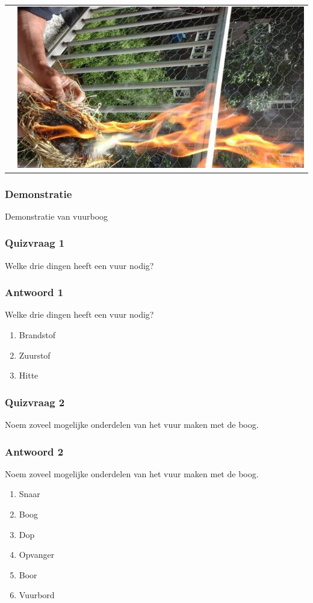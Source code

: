 \documentclass[a4paper, handout]{beamer}
\begin{document}
\begin{frame}
\begin{tabular}{ c c }
		&
		\includegraphics[scale=0.2]{blazen-4}
		\\
	\end{tabular}
\end{frame}

\begin{frame}
	\frametitle{Demonstratie}
	Demonstratie van vuurboog
\end{frame}

\begin{frame}
	\frametitle{Quizvraag 1}
	Welke drie dingen heeft een vuur nodig?
\end{frame}

\begin{frame}
	\frametitle{Antwoord 1}
	Welke drie dingen heeft een vuur nodig?
	\begin{enumerate}
		\item{Brandstof}
		\item{Zuurstof}
		\item{Hitte}
	\end{enumerate}
\end{frame}
\begin{frame}
	\frametitle{Quizvraag 2}
	Noem zoveel mogelijke onderdelen van het vuur maken met de boog.
\end{frame}

\begin{frame}
	\frametitle{Antwoord 2}
	Noem zoveel mogelijke onderdelen van het vuur maken met de boog.
	\begin{enumerate}
		\item{Snaar}
		\item{Boog}
		\item{Dop}
		\item{Opvanger}
		\item{Boor}
		\item{Vuurbord}
	\end{enumerate}
\end{frame}
\end{document}
